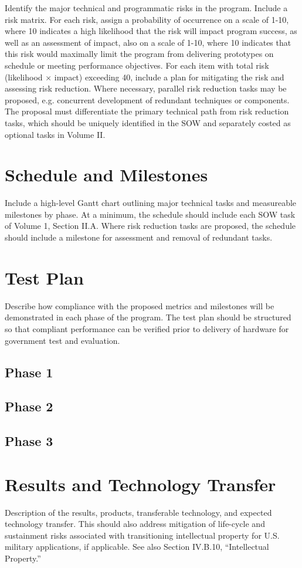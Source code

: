 Identify the major technical and programmatic risks in the program. Include a risk matrix.
For each risk, assign a probability of occurrence on a scale of 1-10, where 10 indicates a high
likelihood that the risk will impact program success, as well as an assessment of impact, also
on a scale of 1-10, where 10 indicates that this risk would maximally limit the program from
delivering prototypes on schedule or meeting performance objectives. For each item with
total risk (likelihood × impact) exceeding 40, include a plan for mitigating the risk and
assessing risk reduction.
Where necessary, parallel risk reduction tasks may be proposed, e.g. concurrent development
of redundant techniques or components. The proposal must differentiate the primary
technical path from risk reduction tasks, which should be uniquely identified in the SOW and
separately costed as optional tasks in Volume II.

\section{Schedule and Milestones}
Include a high-level Gantt chart outlining major technical tasks and measureable milestones
by phase. At a minimum, the schedule should include each SOW task of Volume 1, Section
II.A. Where risk reduction tasks are proposed, the schedule should include a milestone for
assessment and removal of redundant tasks.

\section{Test Plan}
Describe how compliance with the proposed metrics and milestones will be demonstrated in
each phase of the program. The test plan should be structured so that compliant performance
can be verified prior to delivery of hardware for government test and evaluation.
\subsection{Phase 1}

\subsection{Phase 2}

\subsection{Phase 3}

\section{Results and Technology Transfer}
Description of the results, products, transferable technology, and expected technology
transfer. This should also address mitigation of life-cycle and sustainment risks associated
with transitioning intellectual property for U.S. military applications, if applicable. See also
Section IV.B.10, “Intellectual Property.”


